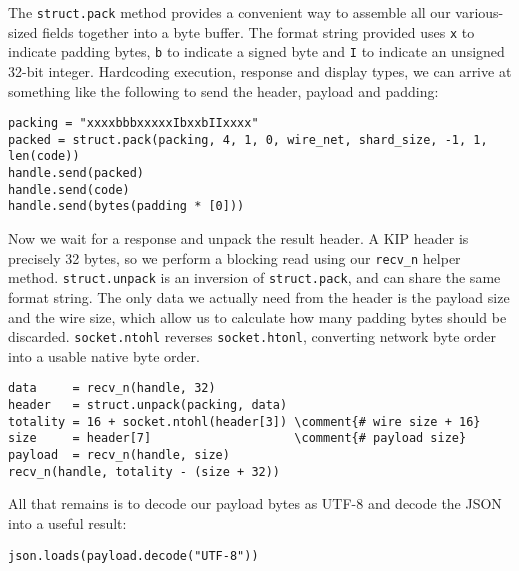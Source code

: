 \documentclass{article}
\newcommand{\comment}[1]{\textcolor{Orange}{#1}}
\begin{document}
The \texttt{struct.pack} method provides a convenient way to assemble all our various-sized fields together into a byte buffer. The format string provided uses \texttt{x} to indicate padding bytes, \texttt{b} to indicate a signed byte and \texttt{I} to indicate an unsigned 32-bit integer. Hardcoding execution, response and display types, we can arrive at something like the following to send the header, payload and padding:
\begin{Verbatim}
packing = "xxxxbbbxxxxxIbxxbIIxxxx"
packed = struct.pack(packing, 4, 1, 0, wire_net, shard_size, -1, 1, len(code))
handle.send(packed)
handle.send(code)
handle.send(bytes(padding * [0]))
\end{Verbatim}

Now we wait for a response and unpack the result header. A KIP header is precisely 32 bytes, so we perform a blocking read using our \texttt{recv\_n} helper method. \texttt{struct.unpack} is an inversion of \texttt{struct.pack}, and can share the same format string. The only data we actually need from the header is the payload size and the wire size, which allow us to calculate how many padding bytes should be discarded. \texttt{socket.ntohl} reverses \texttt{socket.htonl}, converting network byte order into a usable native byte order.

\begin{Verbatim}
data     = recv_n(handle, 32)
header   = struct.unpack(packing, data)
totality = 16 + socket.ntohl(header[3]) \comment{# wire size + 16}
size     = header[7]                    \comment{# payload size}
payload  = recv_n(handle, size)
recv_n(handle, totality - (size + 32))
\end{Verbatim}

All that remains is to decode our payload bytes as UTF-8 and decode the JSON into a useful result:
\begin{Verbatim}
json.loads(payload.decode("UTF-8"))
\end{Verbatim}
\end{document}
